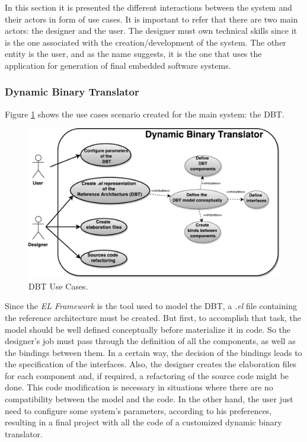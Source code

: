 In this section it is presented the different interactions between the system and their actors in form of use cases. It is important to refer that there are two main actors: the designer and the user. The designer must own technical skills since it is the one associated with the creation/development of the system. The other entity is the user, and as the name suggests, it is the one that uses the application for generation of final embedded software systems.


\subsubsection{Dynamic Binary Translator}

Figure \ref{fig:DBTUseCases} shows the use cases scenario created for the main system: the DBT.

\begin{figure}[!htb]
\centerline{
\includegraphics[scale=0.6]{images/DBT_UseCases.pdf} }
\caption{DBT Use Cases.}
\label{fig:DBTUseCases} 
\end{figure}

Since the \textit{EL Framework} is the tool used to model the DBT, a \textit{.el} file containing the reference architecture must be created. But first, to accomplish that task, the model should be well defined conceptually before materialize it in code. So the designer's job must pass through the definition of all the components, as well as the bindings between them. In a certain way, the decision of the bindings leads to the specification of the interfaces. Also, the designer creates the elaboration files for each component and, if required, a refactoring of the source code might be done. This code modification is necessary in situations where there are no compatibility between the model and the code. In the other hand, the user just need to configure some system's parameters, according to his preferences, resulting in a final project with all the code of a customized dynamic binary translator.

